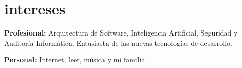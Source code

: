 \documentclass[]{friggeri-cv} %
\begin{document}





\section{intereses}

\textbf{Profesional:} Arquitectura de Software, Inteligencia Artificial, Seguridad y Auditoría Informática. Entusiasta de las nuevas tecnologías de desarrollo. 

\textbf{Personal:} Internet, leer, música y mi familia.

\end{document}
